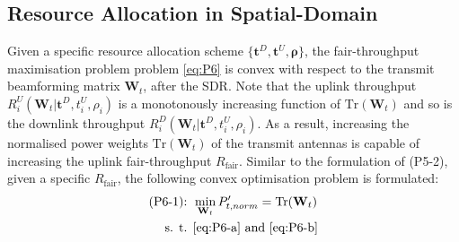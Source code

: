 \documentclass[12pt,draftcls,onecolumn,journal]{IEEEtran}
\begin{document}
\subsection{Resource Allocation in Spatial-Domain}

Given a specific resource allocation scheme $\{\mathbf{t}^{D}, \mathbf{t}^{U}, \boldsymbol{\rho}\}$, the fair-throughput maximisation problem problem \eqref{eq:P6} is convex with respect to the transmit beamforming matrix $\mathbf{W}_t$, after the SDR.  Note that the uplink throughput $R_i^U(\mathbf{W}_t | \mathbf{t}^D,t_i^U,\rho_i)$ is a monotonously increasing function of $\text{Tr}(\mathbf{W}_t)$ and so is the downlink throughput $R_i^D(\mathbf{W}_t | \mathbf{t}^D,t_i^U,\rho_i)$. As a result, increasing the normalised power weights $\text{Tr}(\mathbf{W}_t)$ of the transmit antennas is capable of increasing the uplink fair-throughput $R_{\text{fair}}$. Similar to the formulation of (P5-2), given a specific $R_{\text{fair}}$, the following convex optimisation problem is formulated:
\begin{align}
	\text{(P6-1): } &\min_{\mathbf{W}_t} P_{t,norm}' = \text{Tr}(\mathbf{W}_t) \label{eq:P6-1} \\
	\text{s. t. } & \text{\eqref{eq:P6-a} and \eqref{eq:P6-b}} \nonumber
\end{align}
\end{document}
